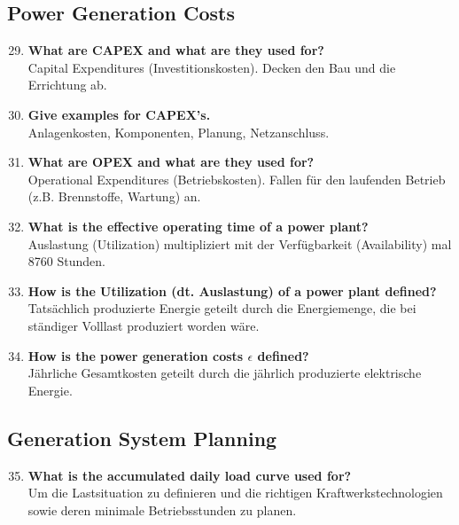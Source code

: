 \documentclass{article}
\begin{document}
\subsection*{Power Generation Costs}
\begin{enumerate}
    \setcounter{enumi}{28}
    \item \textbf{What are CAPEX and what are they used for?} \\
    Capital Expenditures (Investitionskosten). Decken den Bau und die Errichtung ab.
    \item \textbf{Give examples for CAPEX’s.} \\
    Anlagenkosten, Komponenten, Planung, Netzanschluss.
    \item \textbf{What are OPEX and what are they used for?} \\
    Operational Expenditures (Betriebskosten). Fallen für den laufenden Betrieb (z.B. Brennstoffe, Wartung) an.
    \item \textbf{What is the effective operating time of a power plant?} \\
    Auslastung (Utilization) multipliziert mit der Verfügbarkeit (Availability) mal 8760 Stunden.
    \item \textbf{How is the Utilization (dt. Auslastung) of a power plant defined?} \\
    Tatsächlich produzierte Energie geteilt durch die Energiemenge, die bei ständiger Volllast produziert worden wäre.
    \item \textbf{How is the power generation costs $\epsilon$ defined?} \\
    Jährliche Gesamtkosten geteilt durch die jährlich produzierte elektrische Energie.
\end{enumerate}

\subsection*{Generation System Planning}
\begin{enumerate}
    \setcounter{enumi}{34}
    \item \textbf{What is the accumulated daily load curve used for?} \\
    Um die Lastsituation zu definieren und die richtigen Kraftwerkstechnologien sowie deren minimale Betriebsstunden zu planen.
\end{enumerate}
\end{document}
